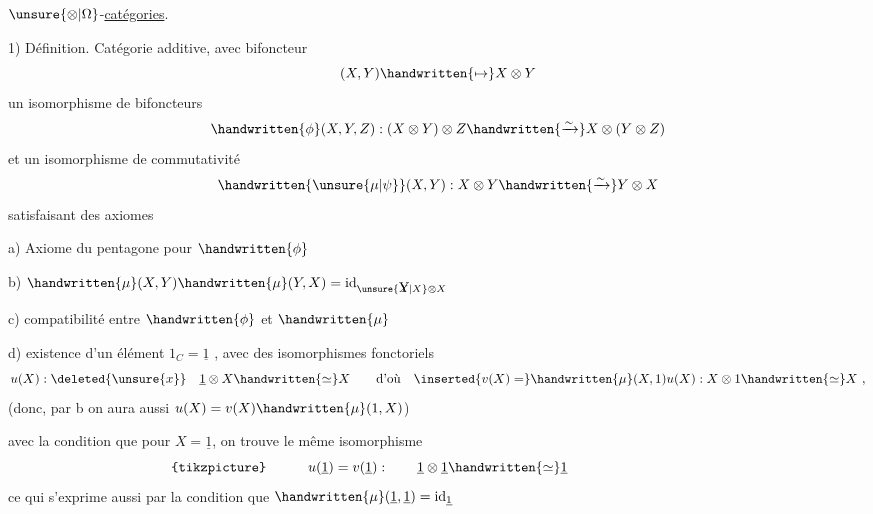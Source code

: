 

$\unsure{\otimes|\Omega}$-\uline{catégories}.

1) Définition. Catégorie  additive, avec bifoncteur
\[
(X,Y)\handwritten{\mapsto}X\otimes Y
\]
 un  isomorphisme de bifoncteurs
\[
\handwritten{\phi}(X,Y,Z): (X\otimes Y)\otimes Z\handwritten{\xrightarrow{\sim}}X\otimes(Y\otimes Z)
\]
et un isomorphisme de commutativité
\[
\handwritten{\unsure{\mu|\psi}}(X,Y): X\otimes Y\handwritten{\xrightarrow{\sim}}Y\otimes X
\]
satisfaisant des axiomes

a) Axiome du pentagone pour $\handwritten{\phi}$ 

b) $\handwritten{\mu}(X,Y)\handwritten{\mu}(Y,X)=\mathrm{id}_{\unsure{\rlap{Y}X|X}\otimes X}$ \handwritten{;}

c) compatibilité entre $\handwritten{\phi}$ et $\handwritten{\mu}$ 

d) existence d'un élément $1_C=\underline{1}$ , avec des isomorphismes fonctoriels
\[
u(X):\deleted{\unsure{x}}\quad\underline{1}\otimes X\handwritten{\simeq}X
\qquad\text{d'où}\quad
\inserted{v(X)=}\handwritten{\mu}(X,1)u(X): X\otimes1\handwritten{\simeq}X\ ,
\]
(donc, par b on aura aussi $u(X)=v(X)\handwritten{\mu}(1,X)$)

avec la condition que pour $X=\underline{1}$, on trouve le même isomorphisme
\[
\makebox[0pt][r]{\begin{tikzpicture}[x=1em,y=1em]\fill (0,0) circle (.045);\end{tikzpicture}\hspace{3em}}
u(\underline{1})=v(\underline{1}) :\qquad \underline{1}\otimes\underline{1}\handwritten{\simeq}\underline{1}
\]
ce qui s'exprime aussi par la condition que $\handwritten{\mu}(\underline{1},\underline{1})=\mathrm{id}_{\underline{1}}$ \handwritten{;}


